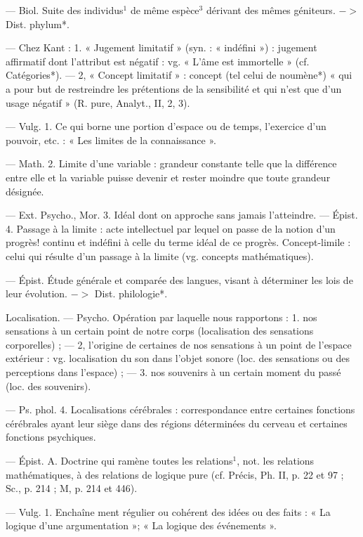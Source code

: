 \begin{itemize}[leftmargin=1cm, label=, itemsep=1pt]
 — Biol. Suite des individus$^1$
de même espèce$^3$ dérivant des
mêmes géniteurs. $->$ Dist. phylum*.

 — Chez Kant : 1. « Jugement limitatif » (syn. : « indéfini ») :
jugement affirmatif dont l’attribut
est négatif : vg. « L’âme est immortelle » (cf. Catégories*). — 2, « Concept limitatif » : concept (tel celui de
noumène*) « qui a pour but de restreindre les prétentions de la sensibilité et qui n’est que d'un usage
négatif » (R. pure, Analyt., II, 2, 3).

 — Vulg. 1. Ce qui borne une
portion d’espace ou de temps, l’exercice d’un pouvoir, etc. : « Les limites
de la connaissance ».

— Math. 2. Limite d'une variable :
grandeur constante telle que la
différence entre elle et la variable
puisse devenir et rester moindre que
toute grandeur désignée.

— Ext. Psycho., Mor. 3. Idéal dont
on approche sans jamais l’atteindre.
— Épist. 4. Passage à la limite :
acte intellectuel par lequel on passe
de la notion d’un progrès! continu
et indéfini à celle du terme idéal de
ce progrès. Concept-limile : celui qui
résulte d’un passage à la limite (vg.
concepts mathématiques).

 — Épist. Étude générale
et comparée des langues, visant à
déterminer les lois de leur évolution.
 $->$ Dist. philologie*.

\ib{}Localisation. — Psycho. Opération
par laquelle nous rapportons : 1.
nos sensations à un certain point de
notre corps (localisation des sensations corporelles) ; — 2, l’origine
de certaines de nos sensations à un
point de l’espace extérieur : vg.
localisation du son dans l’objet sonore (loc. des sensations ou des perceptions dans l’espace) ; — 3. nos
souvenirs à un certain moment du
passé (loc. des souvenirs).

— Ps. phol. 4. Localisations cérébrales : correspondance entre certaines fonctions cérébrales ayant leur
siège dans des régions déterminées
du cerveau et certaines fonctions
psychiques.

 — Épist. A. Doctrine qui
ramène toutes les relations$^1$, not.
les relations mathématiques, à des
relations de logique pure (cf. Précis,
Ph. II, p. 22 et 97 ; Sc., p. 214 ; M,
p. 214 et 446).

 — Vulg. 1. Enchaîne
ment régulier ou cohérent des idées
ou des faits : « La logique d’une
argumentation »; « La logique des
événements ».


\end{itemize}
